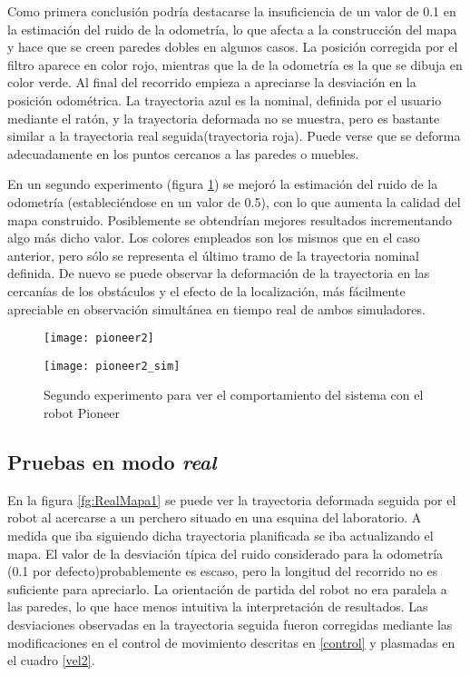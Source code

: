  Como primera conclusión podría destacarse la insuficiencia de un valor de 0.1 en la estimación del ruido de la odometría, lo que afecta a la construcción del mapa y hace que se creen paredes dobles en algunos casos. La posición corregida por el filtro aparece en color rojo, mientras que la de la odometría es la que se dibuja en color verde. Al final del recorrido empieza a apreciarse la desviación en la posición odométrica. La trayectoria azul es la nominal, definida por el usuario mediante el ratón, y la trayectoria deformada no se muestra, pero es bastante similar a la trayectoria real seguida(trayectoria roja). Puede verse que se deforma adecuadamente en los puntos cercanos a las paredes o muebles.

 En un segundo experimento (figura \ref{fg:pioneerSim1b}) se mejoró la estimación del ruido de la odometría (estableciéndose en un valor de 0.5), con lo que aumenta la calidad del mapa construido. Posiblemente se obtendrían mejores resultados incrementando algo más dicho valor. Los colores empleados son los mismos que en el caso anterior, pero sólo se representa el último tramo de la trayectoria nominal definida. De nuevo se puede observar la deformación de la trayectoria en las cercanías de los obstáculos y el efecto de la localización, más fácilmente apreciable en observación simultánea en tiempo real de ambos simuladores.

 \begin{figure}[h]
  \centering\texttt{[image: pioneer2]}

  \vspace{0.5cm}

  \centering\texttt{[image: pioneer2\_sim]}
  \caption{Segundo experimento para ver el comportamiento del sistema con el robot Pioneer}\label{fg:pioneerSim1b}
\end{figure}

\clearpage
\subsection{Pruebas en modo \emph{real}}

En la figura \ref{fg:RealMapa1} se puede ver la trayectoria deformada seguida por el robot al acercarse a un perchero situado en una esquina del laboratorio. A medida que iba siguiendo dicha trayectoria planificada se iba actualizando el mapa. El valor de la desviación típica del ruido considerado para la odometría (0.1 por defecto)probablemente es escaso, pero la longitud del recorrido no es suficiente para apreciarlo. La orientación de partida del robot no era paralela a las paredes, lo que hace menos intuitiva la interpretación de resultados. Las desviaciones observadas en la trayectoria seguida fueron corregidas mediante las modificaciones en el control de movimiento descritas en \ref{control} y plasmadas en el cuadro \ref{vel2}.

